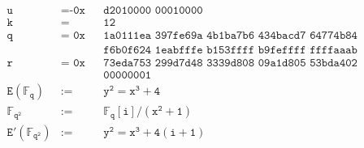 \documentclass[11pt]{article}
\begin{document}
\begin{align*}
\texttt{u} &= \texttt{-0x} && \texttt{d2010000 00010000} \\
\texttt{k} &= &&\texttt{12} \\
\texttt{q} &= \texttt{ 0x} && \texttt{1a0111ea 397fe69a 4b1ba7b6 434bacd7 64774b84 f38512bf 6730d2a0} \\
& && \texttt{f6b0f624 1eabfffe b153ffff b9feffff ffffaaab} \\
\texttt{r} &= \texttt{ 0x} && \texttt{73eda753 299d7d48 3339d808 09a1d805 53bda402 fffe5bfe ffffffff}\\
& && \texttt{00000001} \\
\mathtt{E(\mathbb{F}_q)} &:= &&\mathtt{y^2 = x^3 + 4} \\
\mathtt{\mathbb{F}_{q^2}} &:= &&\mathtt{\mathbb{F}_q[i]/(x^2 + 1)} \\
\mathtt{E'(\mathbb{F}_{q^2})} &:= &&\mathtt{y^2 = x^3 + 4(i + 1)} \\
\end{align*}


\end{document}
